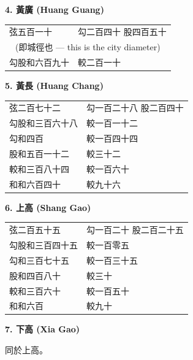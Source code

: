 \documentclass[11pt,a4paper]{article}
\begin{document}
\vspace{0.3cm}

\textbf{4. 黃廣 (Huang Guang)}

\begin{center}
\begin{tabular}{ll}
弦五百一十 & 勾二百四十 \quad 股四百五十 \\
\multicolumn{2}{c}{(即城徑也 --- this is the city diameter)} \\
勾股和六百九十 & 較二百一十 \\
\end{tabular}
\end{center}

\vspace{0.3cm}

\textbf{5. 黃長 (Huang Chang)}

\begin{center}
\begin{tabular}{ll}
弦二百七十二 & 勾一百二十八 \quad 股二百四十 \\
勾股和三百六十八 & 較一百一十二 \\
勾和四百 & 較一百四十四 \\
股和五百一十二 & 較三十二 \\
較和三百八十四 & 較一百六十 \\
和和六百四十 & 較九十六 \\
\end{tabular}
\end{center}

\vspace{0.3cm}

\textbf{6. 上高 (Shang Gao)}

\begin{center}
\begin{tabular}{ll}
弦二百五十五 & 勾一百二十 \quad 股二百二十五 \\
勾股和三百四十五 & 較一百零五 \\
勾和三百七十五 & 較一百三十五 \\
股和四百八十 & 較三十 \\
較和三百六十 & 較一百五十 \\
和和六百 & 較九十 \\
\end{tabular}
\end{center}

\vspace{0.3cm}

\textbf{7. 下高 (Xia Gao)}

同於上高。
\end{document}
